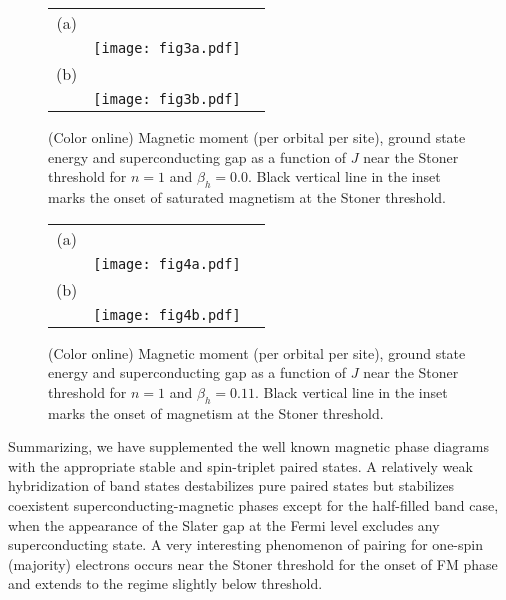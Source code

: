 \documentclass[aps,prb,showpacs,reprint]{revtex4-1}
\begin{document}
\begin{figure}[htbp]
\centering
\begin{tabular}{ccc}
  (a) & & \quad \quad \quad \quad \quad\\
      & \texttt{[image: fig3a.pdf]} & \\
  (b) & & \quad \quad \quad \quad \quad\\
      & \texttt{[image: fig3b.pdf]} &\\
\end{tabular}
\caption{(Color online) Magnetic moment (per orbital per site), ground state energy and
superconducting gap as a function of $J$ near the Stoner
threshold for $n=1$ and $\beta_h=0.0$. Black vertical line in the inset marks the onset of saturated magnetism at the Stoner threshold.}
\label{fig:slice_J_b0}
\end{figure}
\begin{figure}[htpb]
\centering
\begin{tabular}{ccc}
  (a) & & \quad \quad \quad \quad \quad\\
      & \texttt{[image: fig4a.pdf]} & \\
  (b) & & \quad \quad \quad \quad \quad\\
      & \texttt{[image: fig4b.pdf]} &\\
\end{tabular}
\caption{(Color online) Magnetic moment (per orbital per site), ground state energy and
superconducting gap as a function of $J$ near the Stoner
threshold for $n=1$ and $\beta_h=0.11$. Black vertical line in the inset marks the onset of  magnetism at the Stoner threshold.}
\label{fig:slice_J_b011}
\end{figure}

Summarizing, we have supplemented the well known magnetic phase diagrams with
the appropriate stable and spin-triplet paired states. A relatively
weak hybridization of band states destabilizes pure paired states but
stabilizes coexistent superconducting-magnetic phases except for the half-filled
band case, when the appearance of the Slater gap at the Fermi level excludes any
superconducting state. A very interesting phenomenon of pairing for one-spin
(majority) electrons occurs near the Stoner threshold for the onset of FM phase
and extends to the regime slightly below threshold.

\end{document}

